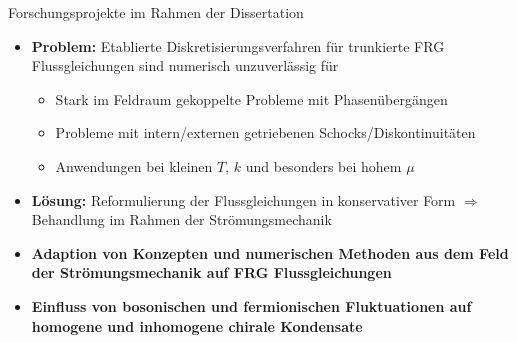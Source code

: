 \documentclass[10pt]{beamer}
\begin{document}
\begin{frame}{Forschungsprojekte im Rahmen der Dissertation}
	\vspace{-0.1cm}
	\begin{itemize}
		\item<1-|handout:1> \textbf{Problem:} Etablierte Diskretisierungsverfahren für trunkierte FRG Flussgleichungen sind numerisch unzuverlässig für
		\begin{itemize}
			\item Stark im Feldraum gekoppelte Probleme mit Phasenübergängen
			\item Probleme mit intern/externen getriebenen Schocks/Diskontinuitäten
			\item Anwendungen bei kleinen $T$, $k$ und besonders bei hohem $\mu$
		\end{itemize}\vspace{0.25em}
		\item<2-|handout:1> \textbf{Lösung:} Reformulierung der Flussgleichungen in konservativer Form $\Rightarrow$ Behandlung im Rahmen der Strömungsmechanik\vspace{0.6em}
		\item<3-|handout:1> \textbf{Adaption von Konzepten und numerischen Methoden aus dem Feld der Strömungsmechanik auf FRG Flussgleichungen}
		\item<3-|handout:1> \textbf{Einfluss von bosonischen und fermionischen Fluktuationen auf homogene und inhomogene chirale Kondensate}
	\end{itemize}
	

	

\end{frame}
\end{document}
